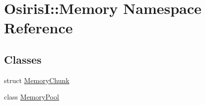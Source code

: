 \hypertarget{namespace_osiris_i_1_1_memory}{\section{Osiris\-I\-:\-:Memory Namespace Reference}
\label{namespace_osiris_i_1_1_memory}
}
\subsection*{Classes}
\begin{DoxyCompactItemize}
\item 
struct \hyperlink{struct_osiris_i_1_1_memory_1_1_memory_chunk}{Memory\-Chunk}
\item 
class \hyperlink{class_osiris_i_1_1_memory_1_1_memory_pool}{Memory\-Pool}
\end{DoxyCompactItemize}
